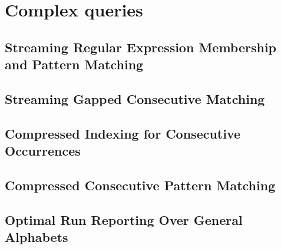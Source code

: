 \part{Complex queries}\label{part:complex_queries}

\mainmatter
\chapter{Streaming Regular Expression Membership and Pattern Matching}\label{chap:regexp}


\mainmatter
\chapter{Streaming Gapped Consecutive Matching}\label{chap:gapped_stream}

\mainmatter
\chapter{Compressed Indexing for Consecutive Occurrences}\label{chap:gapped_index}


\mainmatter
\chapter{Compressed Consecutive Pattern Matching}\label{chap:gapped_pm}

\mainmatter
\chapter{Optimal Run Reporting Over General Alphabets}\label{chap:squares}

